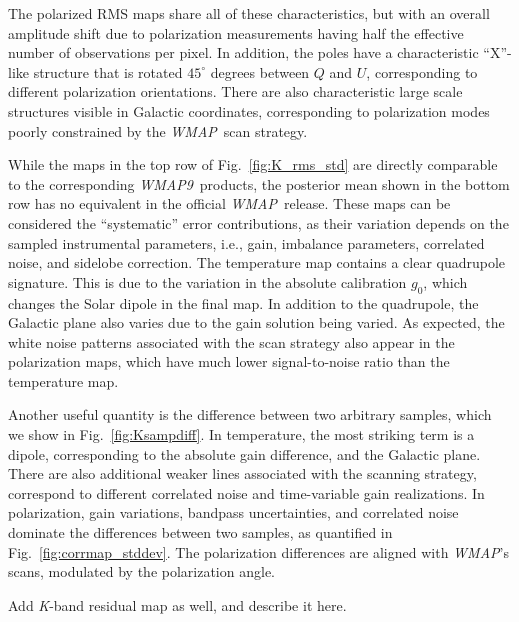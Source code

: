 \documentclass[twocolumn]{../../common/aa}
\def\WMAP{\emph{WMAP}}
\def\WMAPnine{\emph{WMAP9}}
\newcommand{\K}[0]{\textit K}
\begin{document}
The polarized RMS maps share all of these characteristics, but with an overall amplitude shift due to polarization measurements having half the effective number of observations per pixel. In addition, the poles have a characteristic ``X''-like structure that is rotated $45^\circ$ degrees between $Q$ and $U$, corresponding to different polarization orientations. There are also characteristic large scale structures visible in Galactic coordinates, corresponding to polarization modes poorly constrained by the \WMAP\ scan strategy.

While the maps in the top row of Fig.~\ref{fig:K_rms_std} are directly comparable to the corresponding \WMAPnine\ products, the posterior mean shown in the bottom row has no equivalent in the official \WMAP\ release. These maps can be considered the ``systematic'' error contributions, as their variation depends on the sampled instrumental parameters, i.e., gain, imbalance parameters, correlated noise, and sidelobe correction. The temperature map contains a clear quadrupole signature. This is due to the variation in the absolute calibration $g_0$, which changes the Solar dipole in the final map. In addition to the quadrupole, the Galactic plane also varies due to the gain solution being varied. As expected, the white noise patterns associated with the scan strategy also appear in the polarization maps, which have much lower signal-to-noise ratio than the temperature map. %


Another useful quantity is the difference between two arbitrary samples, which we show in Fig.~\ref{fig:Ksampdiff}. In temperature, the most striking term is a dipole, corresponding to the absolute gain difference, and the Galactic plane. There are also additional weaker lines associated with the scanning strategy, correspond to different correlated noise and time-variable gain realizations. In polarization, gain variations,  bandpass uncertainties, and correlated noise dominate the differences between two samples, as quantified in Fig.~\ref{fig:corrmap_stddev}. The polarization differences are aligned with \WMAP's scans, modulated by the polarization angle.

{\color{red} Add \K-band residual map as well, and describe it here.}
\end{document}
